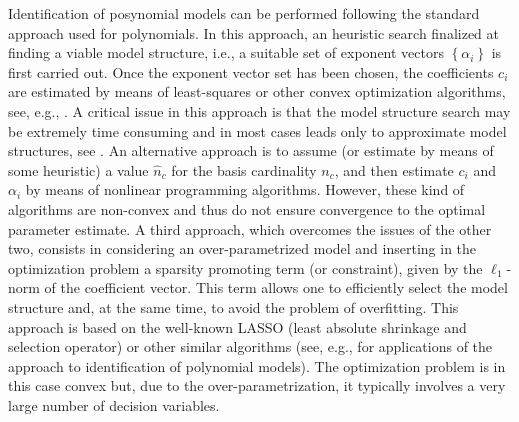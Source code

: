 \documentclass[11pt]{article}
\begin{document}
Identification of posynomial models can be performed following the
standard approach used for polynomials. In this approach, an heuristic
search finalized at finding a viable model structure, i.e., a suitable
set of exponent vectors $\left\{ \alpha_{i}\right\} $ is first carried
out. Once the exponent vector set has been chosen, the coefficients
$c_{i}$ are estimated by means of least-squares or other convex optimization
algorithms, see, e.g., \cite{SpPiLo06,PuPi07,DaGiSa03}. A critical
issue in this approach is that the model structure search may be extremely
time consuming and in most cases leads only to approximate model structures,
see \cite{MiNoAUT04}. An alternative approach is to assume (or estimate
by means of some heuristic) a value $\hat{n}_{c}$ for the basis cardinality
$n_{c}$, and then estimate $c_{i}$ and $\alpha_{i}$ by means of
nonlinear programming algorithms. However, these kind of algorithms
are non-convex and thus do not ensure convergence to the optimal parameter
estimate. A third approach, which overcomes the issues of the other
two, consists in considering an over-parametrized model and inserting
in the optimization problem a sparsity promoting term (or constraint),
given by the $\ell_{1}$-norm of the coefficient vector. This term
allows one to efficiently select the model structure and, at the same
time, to avoid the problem of overfitting. This approach is based
on the well-known LASSO (least absolute shrinkage and selection operator)
or other similar algorithms (see, e.g., \cite{Tib96,KuLoBr06,BoSePi10,NoTAC12}
for applications of the approach to identification of polynomial models).
The optimization problem is in this case convex but, due to the over-parametrization,
it typically involves a very large number of decision variables.
\end{document}
